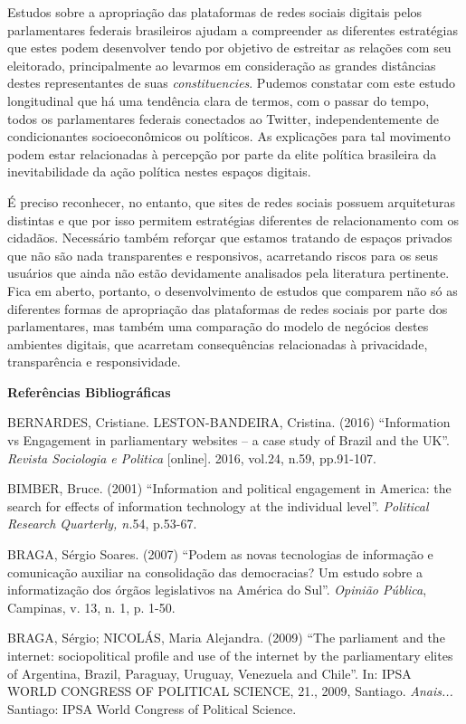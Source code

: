 Estudos sobre a apropriação das plataformas de redes sociais digitais
pelos parlamentares federais brasileiros ajudam a compreender as
diferentes estratégias que estes podem desenvolver tendo por objetivo de
estreitar as relações com seu eleitorado, principalmente ao levarmos em
consideração as grandes distâncias destes representantes de suas
\emph{constituencies}. Pudemos constatar com este estudo longitudinal
que há uma tendência clara de termos, com o passar do tempo, todos os
parlamentares federais conectados ao Twitter, independentemente de
condicionantes socioeconômicos ou políticos. As explicações para tal
movimento podem estar relacionadas à percepção por parte da elite
política brasileira da inevitabilidade da ação política nestes espaços
digitais.

É preciso reconhecer, no entanto, que sites de redes sociais possuem
arquiteturas distintas e que por isso permitem estratégias diferentes de
relacionamento com os cidadãos. Necessário também reforçar que estamos
tratando de espaços privados que não são nada transparentes e
responsivos, acarretando riscos para os seus usuários que ainda não
estão devidamente analisados pela literatura pertinente. Fica em aberto,
portanto, o desenvolvimento de estudos que comparem não só as diferentes
formas de apropriação das plataformas de redes sociais por parte dos
parlamentares, mas também uma comparação do modelo de negócios destes
ambientes digitais, que acarretam consequências relacionadas à
privacidade, transparência e responsividade.

\textbf{Referências Bibliográficas }

BERNARDES, Cristiane. LESTON-BANDEIRA, Cristina. (2016) ``Information vs
Engagement in parliamentary websites -- a case study of Brazil and the
UK''. \emph{Revista Sociologia e Politica} {[}online{]}. 2016, vol.24,
n.59, pp.91-107.

BIMBER, Bruce. (2001) ``Information and political engagement in America:
the search for effects of information technology at the individual
level''. \emph{Political Research Quarterly, n.}54, p.53-67.

BRAGA, Sérgio Soares. (2007) ``Podem as novas tecnologias de informação
e comunicação auxiliar na consolidação das democracias? Um estudo sobre
a informatização dos órgãos legislativos na América do Sul''.
\emph{Opinião Pública}, Campinas, v. 13, n. 1, p. 1-50.

BRAGA, Sérgio; NICOLÁS, Maria Alejandra. (2009) ``The parliament and the
internet: sociopolitical profile and use of the internet by the
parliamentary elites of Argentina, Brazil, Paraguay, Uruguay, Venezuela
and Chile''. In: IPSA WORLD CONGRESS OF POLITICAL SCIENCE, 21., 2009,
Santiago. \emph{Anais...} Santiago: IPSA World Congress of Political
Science.

